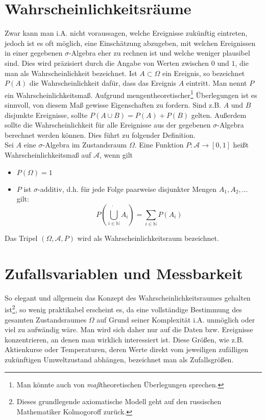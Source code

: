 \documentclass[12pt]{article}
\begin{document}
\section{Wahrscheinlichkeitsräume}
Zwar kann man i.A. nicht voraussagen, welche Ereignisse zukünftig eintreten, jedoch ist
es oft möglich, eine Einschätzung abzugeben, mit welchen Ereignissen in einer gegebenen
$\sigma$-Algebra eher zu rechnen ist und welche weniger plausibel sind. Dies wird präzisiert durch
die Angabe von Werten zwischen $0$ und $1$, die man als Wahrscheinlichkeit bezeichnet. Ist
$A \subset \Omega$ ein Ereignis, so bezeichnet $P(A)$ die Wahrscheinlichkeit dafür, dass das Ereignis $A$ eintritt. Man nennt $P$ ein
Wahrscheinlichkeitsmaß. Aufgrund mengentheoretischer\footnote{Man könnte auch von \textit{maß}theoretischen Überlegungen sprechen.} Überlegungen ist es sinnvoll, von
diesem Maß gewisse Eigenschaften zu fordern. Sind z.B. $A$ und $B$ disjunkte Ereignisse, sollte
$P(A \cup B) = P(A)+P(B)$ gelten. Außerdem sollte die Wahrscheinlichkeit für alle Ereignisse
aus der gegebenen $\sigma$-Algebra berechnet werden können. Dies führt zu folgender Definition.\\

Sei $A$ eine $\sigma$-Algebra im Zustandsraum $\Omega$. Eine Funktion $P : \mathscr{A} \to [0, 1]$ heißt Wahrscheinlichkeitsmaß
auf $\mathscr{A}$, wenn gilt
\begin{itemize}
\item{$P(\Omega) = 1$}
\item{$P$ ist $\sigma$-additiv, d.h. für jede Folge paarweise disjunkter Mengen $A_1, A_2, . . .$ gilt: \[
P\left( \dot{\bigcup\limits_{i \in \mathbb{N}}}A_i \right) = \sum_{i \in \mathbb{N}}P(A_i)
\]}
\end{itemize}
Das Tripel $(\Omega, \mathscr{A}, P)$ wird als Wahrscheinlichkeitsraum bezeichnet.

\section{Zufallsvariablen und Messbarkeit}
So elegant und allgemein das Konzept des Wahrscheinlichkeitsraumes gehalten ist\footnote{Dieses grundlegende axiomatische Modell geht auf den russischen Mathematiker Kolmogoroff zurück.}, so wenig
praktikabel erscheint es, da eine vollständige Bestimmung des gesamten Zustandsraumes $\Omega$
auf Grund seiner Komplexität i.A. unmöglich oder viel zu aufwändig wäre. Man wird sich
daher nur auf die Daten bzw. Ereignisse konzentrieren, an denen man wirklich interessiert ist.
Diese Größen, wie z.B. Aktienkurse oder Temperaturen, deren Werte direkt vom jeweiligen
zufälligen zukünftigen Umweltzustand abhängen, bezeichnet man als Zufallsgrößen.
\end{document}
